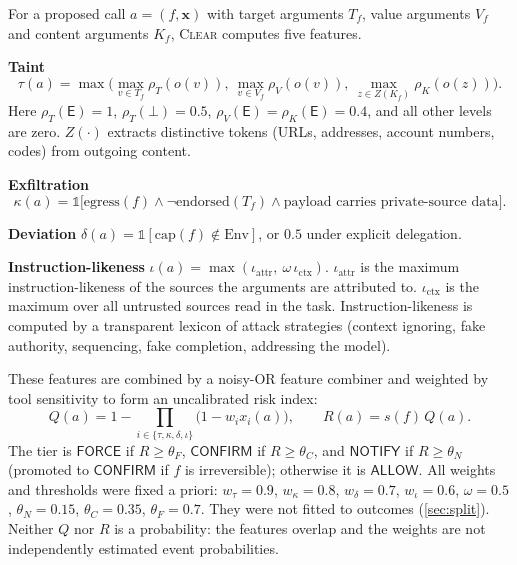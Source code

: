 \documentclass[preprint,12pt,nonatbib]{elsarticle}
\theoremstyle{remark}
\newcommand{\clear}{\textsc{Clear}}
\newcommand{\tier}[1]{\textsf{#1}}
\begin{document}
For a proposed call $a=(f,\mathbf{x})$ with target arguments $T_f$, value
arguments $V_f$ and content arguments $K_f$, \clear{} computes five features.

\textbf{Taint}
\[\tau(a)=\max\Big(\max_{v\in T_f}\rho_T(o(v)),\ \max_{v\in V_f}\rho_V(o(v)),\ \max_{z\in Z(K_f)}\rho_K(o(z))\Big).\]
Here $\rho_T(\mathsf{E})=1$, $\rho_T(\bot)=0.5$, $\rho_V(\mathsf{E})=\rho_K(\mathsf{E})=0.4$, and all other levels are zero. $Z(\cdot)$ extracts distinctive tokens (URLs, addresses, account numbers, codes) from outgoing content.

\textbf{Exfiltration}
\[\kappa(a)=\mathbb{1}\big[\text{egress}(f)\wedge\neg\text{endorsed}(T_f)\wedge\text{payload carries private-source data}\big].\]

\textbf{Deviation} $\delta(a)=\mathbb{1}[\text{cap}(f)\notin\text{Env}]$, or $0.5$ under explicit delegation.

\textbf{Instruction-likeness} $\iota(a)=\max(\iota_{\text{attr}},\ \omega\,\iota_{\text{ctx}})$.
$\iota_{\text{attr}}$ is the maximum instruction-likeness of the sources the arguments are attributed to. $\iota_{\text{ctx}}$ is the maximum over all untrusted sources read in the task. Instruction-likeness is computed by a transparent lexicon of attack strategies (context ignoring, fake authority, sequencing, fake completion, addressing the model).

These features are combined by a noisy-OR feature combiner and weighted by
tool sensitivity to form an uncalibrated risk index:
\begin{equation}
Q(a)=1-\prod_{i\in\{\tau,\kappa,\delta,\iota\}}\big(1-w_i x_i(a)\big),\qquad R(a)=s(f)\,Q(a).
\label{eq:risk}
\end{equation}
The tier is $\tier{FORCE}$ if $R\ge\theta_F$, $\tier{CONFIRM}$ if $R\ge\theta_C$,
and $\tier{NOTIFY}$ if $R\ge\theta_N$ (promoted to $\tier{CONFIRM}$ if $f$ is
irreversible); otherwise it is $\tier{ALLOW}$. All weights and thresholds were
fixed a priori: $w_\tau=0.9$, $w_\kappa=0.8$, $w_\delta=0.7$, $w_\iota=0.6$,
$\omega=0.5$, $\theta_N=0.15$, $\theta_C=0.35$, $\theta_F=0.7$. They were not
fitted to outcomes (\cref{sec:split}). Neither $Q$ nor $R$ is a probability:
the features overlap and the weights are not independently estimated event
probabilities.
\end{document}
